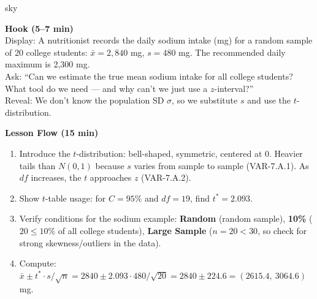 \documentclass[10pt]{article}
\begin{document}
\begin{skillbox}{sky}
\begin{minipage}[t]{0.48\linewidth}
    \textbf{Hook (5--7 min)}\\
    Display: A nutritionist records the daily sodium intake (mg) for a random sample
    of 20 college students: $\bar x = 2{,}840$ mg, $s = 480$ mg.
    The recommended daily maximum is 2{,}300 mg.\\[4pt]
    Ask: ``Can we estimate the true mean sodium intake for all college students? What
    tool do we need --- and why can't we just use a $z$-interval?''\\[4pt]
    Reveal: We don't know the population SD $\sigma$, so we substitute $s$ and use
    the $t$-distribution.
\end{minipage}
\hfill
\begin{minipage}[t]{0.48\linewidth}
    \textbf{Lesson Flow (15 min)}
    \begin{enumerate}
        \item Introduce the $t$-distribution: bell-shaped, symmetric, centered at 0.
              Heavier tails than $N(0,1)$ because $s$ varies from sample to sample
              (VAR-7.A.1). As $df$ increases, the $t$ approaches $z$ (VAR-7.A.2).
        \item Show $t$-table usage: for $C = 95\%$ and $df = 19$, find
              $t^* = 2.093$.
        \item Verify conditions for the sodium example:
              \textbf{Random} (random sample), \textbf{10\%} ($20 \le 10\%$ of all
              college students), \textbf{Large Sample} ($n = 20 < 30$, so check for
              strong skewness/outliers in the data).
        \item Compute: $\bar x \pm t^* \cdot s/\sqrt{n} = 2840 \pm 2.093 \cdot 480/\sqrt{20}
              = 2840 \pm 224.6 = (2615.4,\ 3064.6)$ mg.
    \end{enumerate}
\end{minipage}
\end{skillbox}
\end{document}
